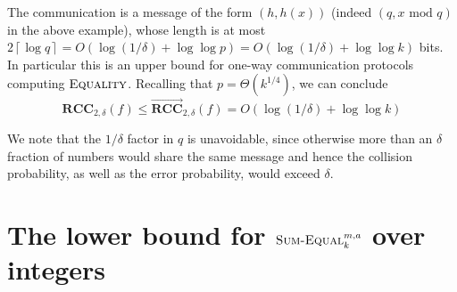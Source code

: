 \documentclass{toc}
\newcommand{\ceil}[1]{ {\left\lceil{#1} \right\rceil}}
\newcommand{\error}{\ensuremath{\delta}}
\renewcommand{\mod}{\text{ mod }}
\newcommand{\bigo}[1]{\ensuremath{{{O} \left( {#1} \right)}}}
\newcommand{\bigtheta}[1]{\ensuremath{{\Theta\left({#1} \right)}}}
\newcommand{\rcc}{\ensuremath{\mathbf{RCC}}}
\newcommand{\rccone}{\ensuremath{\overrightarrow{\mathbf{RCC}}}}
\newcommand{\sumequal}{\textsc{Sum-Equal} }
\begin{document}
The communication is a message of the form $(h,h(x))$ (indeed $(q, x\mod q)$ in the above example), whose length is at most $2\ceil{\log q}=\bigo{\log(1/\error)+\log\log p}=\bigo{\log(1/\error)+\log\log k}$ bits.
In particular this is an upper bound for one-way communication protocols computing $\textsc{Equality}$.
%
Recalling that $p=\bigtheta{k^{1/4}}$,
we can conclude
\[
\rcc_{2,\error} (f) \le\rccone_{2,\error}(f)=\bigo{\log(1/\error)+\log\log k}
\]

We note that the $1/\error$ factor in $q$ is unavoidable, since otherwise more than an $\error$ fraction of numbers would share the same message and hence the collision probability, as well as the error probability, would exceed $\error$.

%
%
\section{The lower bound for
  \texorpdfstring{$\sumequal^{m,a}_k$}{Sum-Equal-sup(m,a)sub(k)} over integers}

\label{sec:over Z}
\end{document}
